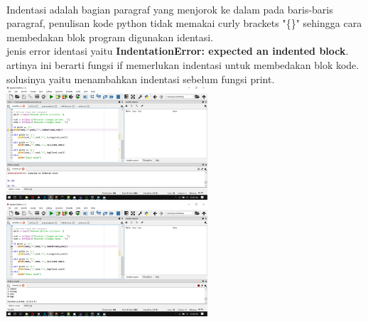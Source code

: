 \documentclass[a4paper,12pt]{report}
\begin{document}
\paragraph{}
Indentasi adalah bagian paragraf yang menjorok ke dalam pada baris-baris paragraf, penulisan kode python tidak memakai curly brackets "\{\}" sehingga cara membedakan blok program digunakan identasi.\\
jenis error identasi yaitu \textbf{IndentationError: expected an indented block}.\\
artinya ini berarti fungsi if memerlukan indentasi untuk membedakan blok kode.\\
solusinya yaitu menambahkan indentasi sebelum fungsi print.\\
\includegraphics[width=7.5cm]{gambar/spyder/Screenshot (100).png}\\ 
 \includegraphics[width=7.5cm]{gambar/spyder/Screenshot (102).png} 
\end{document}
